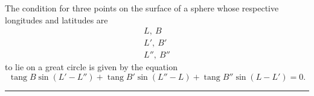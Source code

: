 The condition for three points on the surface of a sphere whose
respective longitudes and latitudes are
\[
\begin{array}{l}
L,\ B\\
L',\ B'\\
L'',\ B''
\end{array}
\]
\noindent to lie on a great circle is given by the equation
\[
\operatorname{tang}B\sin(L'-L'')+\operatorname{tang}B'\sin(L''-L)+
\operatorname{tang}B''\sin(L-L')=0.
\]

\begin{center}\rule{.18\textwidth}{.4pt}\end{center}

\par\clearpage
\noindent{}\makebox[12mm][r]{}\par\medskip

